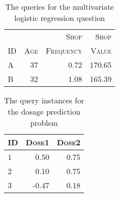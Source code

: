 \documentclass[solution]{ditpaper}
\begin{document}
\begin{table}[htb]
\caption{The queries for the multivariate logistic regression question}
\label{tab:logregress}
\begin{center}
\begin{tabular}{l r r r}
\hline
			 & ~ & \textsc{Shop}  & \textsc{Shop}\\
				\textsc{ID} & \textsc{Age} & \textsc{Frequency}  & \textsc{Value}\\
\hline
A & 37 & 0.72 & 170.65 \\ 
B & 32 & 1.08 & 165.39 \\ 
\hline
\end{tabular}
\end{center}
\end{table}

\begin{table}[h]
\begin{center}
\caption{The query instances for the dosage prediction problem}
\label{tab:dosagePrd}
\noindent\begin{tabular}{@{} l r r@{}}
\hline
				\textsc{ID} & \textsc{Dose1} & \textsc{Dose2} \\
\hline
		1 & 0.50 & 0.75 \\
		2 & 0.10 & 0.75 \\
		3 & -0.47 & 0.18 \\
\hline
\end{tabular}
\end{center}
\end{table}
\end{document}
